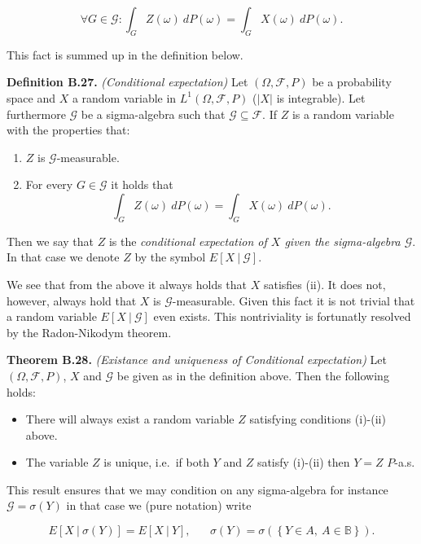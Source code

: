 \documentclass[
]{article}
\providecommand{\tightlist}{%
  \setlength{\itemsep}{0pt}\setlength{\parskip}{0pt}}
\begin{document}
\[
\forall G\in\mathcal{G} : \int_G Z(\omega)\ dP(\omega)=\int_G X(\omega)\ dP(\omega).
\]

This fact is summed up in the definition below.

\textbf{Definition B.27.} \emph{(Conditional expectation)} Let
\((\Omega,\mathcal{F},P)\) be a probability space and \(X\) a random
variable in \(L^1(\Omega,\mathcal{F},P)\) (\(\vert X\vert\) is
integrable). Let furthermore \(\mathcal{G}\) be a sigma-algebra such
that \(\mathcal{G}\subseteq \mathcal{F}\). If \(Z\) is a random variable
with the properties that:

\begin{enumerate}
\def\labelenumi{\roman{enumi}.}
\tightlist
\item
  \(Z\) is \(\mathcal{G}\)-measurable.
\item
  For every \(G\in\mathcal{G}\) it holds that
  \[\int_G Z(\omega)\ dP(\omega)=\int_G X(\omega)\ dP(\omega).\]
\end{enumerate}

Then we say that \(Z\) is the \emph{conditional expectation of \(X\)
given the sigma-algebra \(\mathcal{G}\)}. In that case we denote \(Z\)
by the symbol \(E[X\ \vert\ \mathcal{G}]\).

We see that from the above it always holds that \(X\) satisfies (ii). It
does not, however, always hold that \(X\) is \(\mathcal{G}\)-measurable.
Given this fact it is not trivial that a random variable
\(E[X\ \vert\ \mathcal{G}]\) even exists. This nontriviality is
fortunatly resolved by the Radon-Nikodym theorem.

\textbf{Theorem B.28.} \emph{(Existance and uniqueness of Conditional
expectation)} Let \((\Omega,\mathcal{F},P)\), \(X\) and \(\mathcal{G}\)
be given as in the definition above. Then the following holds:

\begin{itemize}
\tightlist
\item
  There will always exist a random variable \(Z\) satisfying conditions
  (i)-(ii) above.
\item
  The variable \(Z\) is unique, i.e.~if both \(Y\) and \(Z\) satisfy
  (i)-(ii) then \(Y=Z\) \(P\)-a.s.
\end{itemize}

This result ensures that we may condition on any sigma-algebra for
instance \(\mathcal{G}=\sigma(Y)\) in that case we (pure notation) write

\[
E[X\ \vert\ \sigma(Y)]=E[X\ \vert\ Y],\hspace{20pt}\sigma(Y)=\sigma\left(\left\{ Y\in A,\ A\in\mathbb{B}\right\}\right).
\]
\end{document}

